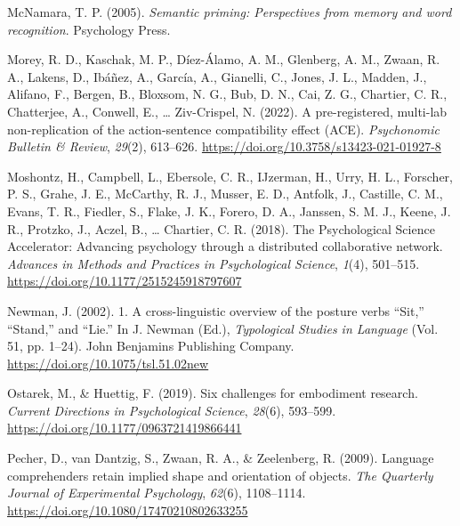 \documentclass[
  man,mask,floatsintext]{apa7}
\newlength{\cslhangindent}
\newlength{\cslentryspacingunit} %
\newenvironment{CSLReferences}[2] %
 {%
  \setlength{\parindent}{0pt}
  \ifodd #1
  \let\oldpar\par
  \def\par{\hangindent=\cslhangindent\oldpar}
  \fi
  \setlength{\parskip}{#2\cslentryspacingunit}
 }%
 {}
\begin{document}
\begin{CSLReferences}{1}{0}
\leavevmode{}%
McNamara, T. P. (2005). \emph{Semantic {priming}: {Perspectives from memory} and {word recognition}}. {Psychology Press}.

\leavevmode{}%
Morey, R. D., Kaschak, M. P., Díez-Álamo, A. M., Glenberg, A. M., Zwaan, R. A., Lakens, D., Ibáñez, A., García, A., Gianelli, C., Jones, J. L., Madden, J., Alifano, F., Bergen, B., Bloxsom, N. G., Bub, D. N., Cai, Z. G., Chartier, C. R., Chatterjee, A., Conwell, E., \ldots{} Ziv-Crispel, N. (2022). A pre-registered, multi-lab non-replication of the action-sentence compatibility effect (ACE). \emph{Psychonomic Bulletin \& Review}, \emph{29}(2), 613--626. \url{https://doi.org/10.3758/s13423-021-01927-8}

\leavevmode{}%
Moshontz, H., Campbell, L., Ebersole, C. R., IJzerman, H., Urry, H. L., Forscher, P. S., Grahe, J. E., McCarthy, R. J., Musser, E. D., Antfolk, J., Castille, C. M., Evans, T. R., Fiedler, S., Flake, J. K., Forero, D. A., Janssen, S. M. J., Keene, J. R., Protzko, J., Aczel, B., \ldots{} Chartier, C. R. (2018). The {Psychological Science Accelerator}: {Advancing} psychology through a distributed collaborative network. \emph{Advances in Methods and Practices in Psychological Science}, \emph{1}(4), 501--515. \url{https://doi.org/10.1177/2515245918797607}

\leavevmode{}%
Newman, J. (2002). 1. {A} cross-linguistic overview of the posture verbs {``{Sit},''} {``{Stand},''} and {``{Lie}.''} In J. Newman (Ed.), \emph{Typological {Studies} in {Language}} (Vol. 51, pp. 1--24). {John Benjamins Publishing Company}. \url{https://doi.org/10.1075/tsl.51.02new}

\leavevmode{}%
Ostarek, M., \& Huettig, F. (2019). Six challenges for {embodiment research}. \emph{Current Directions in Psychological Science}, \emph{28}(6), 593--599. \url{https://doi.org/10.1177/0963721419866441}

\leavevmode{}%
Pecher, D., van Dantzig, S., Zwaan, R. A., \& Zeelenberg, R. (2009). Language comprehenders retain implied shape and orientation of objects. \emph{The Quarterly Journal of Experimental Psychology}, \emph{62}(6), 1108--1114. \url{https://doi.org/10.1080/17470210802633255}


\end{CSLReferences}
\end{document}
